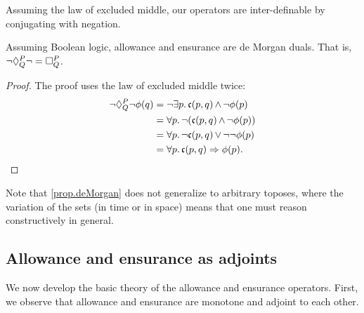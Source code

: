  
    Assuming the law of excluded middle, our operators are inter-definable by conjugating with negation. 
    
    \begin{prop}\label{prop.deMorgan}
    Assuming Boolean logic, allowance and ensurance are de Morgan duals. That is, $\neg \allows{P}{Q} \neg = \ensure{P}{Q}$.
    \end{prop}
    \begin{proof} The proof uses the law of excluded middle twice:
    \begin{align*}
        \neg \allows{P}{Q} \neg \phi(q) &= \neg \exists p.\, \mathfrak{c}(p, q) \meet \neg \phi(p) \\
            &= \forall p.\, \neg (\mathfrak{c}(p, q) \meet \neg \phi(p)) \\
            &= \forall p.\, \neg \mathfrak{c}(p, q) \join \neg\neg \phi(p) \\
            &= \forall p.\, \mathfrak{c}(p, q) \Rightarrow \phi(p). \qedhere
    \end{align*}
    \end{proof}
    Note that \cref{prop.deMorgan} does not generalize to arbitrary toposes, where the variation of the sets (in time or in space) means that one must reason constructively in general.
    
\subsection{Allowance and ensurance as adjoints}
We now develop the basic theory of the allowance and ensurance operators. First, we observe that allowance and ensurance are monotone and adjoint to each other.   
    
